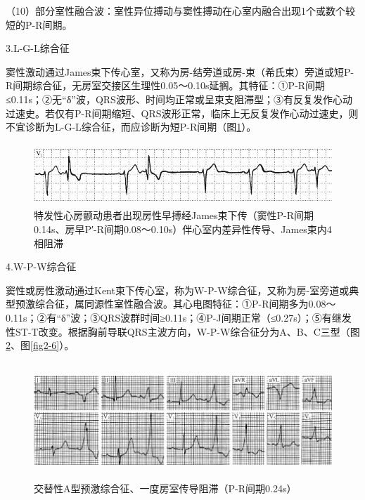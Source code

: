 （10）部分室性融合波：室性异位搏动与窦性搏动在心室内融合出现1个或数个较短的P-R间期。

3.L-G-L综合征

窦性激动通过James束下传心室，又称为房-结旁道或房-束（希氏束）旁道或短P-R间期综合征，无房室交接区生理性0.05～0.10s延搁。其特征：①P-R间期≤0.11s；②无“δ”波，QRS波形、时间均正常或呈束支阻滞型；③有反复发作心动过速史。若仅有P-R间期缩短、QRS波形正常，临床上无反复发作心动过速史，则不宜诊断为L-G-L综合征，而应诊断为短P-R间期（图\ref{fig2-4}）。

\begin{figure}[!htbp]
 \centering
 \includegraphics[width=5.14583in,height=0.91667in]{./images/Image00039.jpg}
 \captionsetup{justification=centering}
 \caption{特发性心房颤动患者出现房性早搏经James束下传（窦性P-R间期0.14s、房早P′-R间期0.08～0.10s）伴心室内差异性传导、James束内4相阻滞}
 \label{fig2-4}
  \end{figure} 

4.W-P-W综合征

窦性或房性激动通过Kent束下传心室，称为W-P-W综合征，又称为房-室旁道或典型预激综合征，属同源性室性融合波。其心电图特征：①P-R间期多为0.08～0.11s；②有“δ”波；③QRS波群时间≥0.11s；④P-J间期正常（≤0.27s）；⑤有继发性ST-T改变。根据胸前导联QRS主波方向，W-P-W综合征分为A、B、C三型（图\ref{fig2-5}、图\ref{fig2-6}）。

\begin{figure}[!htbp]
 \centering
 \includegraphics[width=5.78125in,height=1.72917in]{./images/Image00040.jpg}
 \captionsetup{justification=centering}
 \caption{交替性A型预激综合征、一度房室传导阻滞（P-R间期0.24s）}
 \label{fig2-5}
  \end{figure} 

